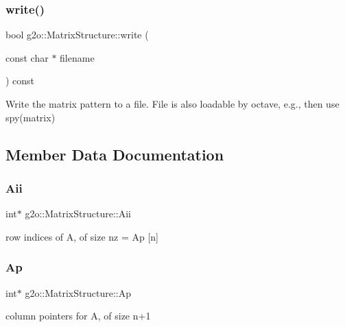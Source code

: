 \subsubsection{\texorpdfstring{write()}{write()}}
{\footnotesize\ttfamily bool g2o\+::\+Matrix\+Structure\+::write (\begin{DoxyParamCaption}\item[{const char $\ast$}]{filename }\end{DoxyParamCaption}) const}

Write the matrix pattern to a file. File is also loadable by octave, e.\+g., then use spy(matrix) 

\subsection{Member Data Documentation}
\mbox{\label{classg2o_1_1_matrix_structure_a7984bf429b8694070ab8db5f5852d8bb}} 
\subsubsection{\texorpdfstring{Aii}{Aii}}
{\footnotesize\ttfamily int$\ast$ g2o\+::\+Matrix\+Structure\+::\+Aii}



row indices of A, of size nz = Ap \mbox{[}n\mbox{]} 

\mbox{\label{classg2o_1_1_matrix_structure_aeeff8e78fb766a433aecbfda4a2e3ffc}} 
\subsubsection{\texorpdfstring{Ap}{Ap}}
{\footnotesize\ttfamily int$\ast$ g2o\+::\+Matrix\+Structure\+::\+Ap}



column pointers for A, of size n+1 

\mbox{\label{classg2o_1_1_matrix_structure_a9cceed2097dcbaa27ed88b7005440616}} 

